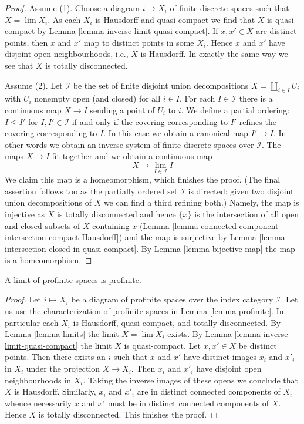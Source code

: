 \begin{proof}
Assume (1). Choose a diagram $i \mapsto X_i$ of finite discrete spaces
such that $X = \lim X_i$. As each $X_i$ is Hausdorff and quasi-compact we find
that $X$ is quasi-compact by Lemma \ref{lemma-inverse-limit-quasi-compact}.
If $x, x' \in X$ are distinct points, then $x$ and $x'$ map to
distinct points in some $X_i$. Hence $x$ and $x'$ have disjoint
open neighbourhoods, i.e., $X$ is Hausdorff. In exactly the same way
we see that $X$ is totally disconnected.

\medskip\noindent
Assume (2). Let $\mathcal{I}$ be the set of finite disjoint union
decompositions $X = \coprod_{i \in I} U_i$ with $U_i$ nonempty open
(and closed) for all $i \in I$.
For each $I \in \mathcal{I}$ there is a continuous map
$X \to I$ sending a point of $U_i$ to $i$. We define a partial
ordering: $I \leq I'$ for $I, I' \in \mathcal{I}$ if and only
if the covering corresponding to $I'$ refines the covering corresponding
to $I$. In this case we obtain a canonical map $I' \to I$. In other
words we obtain an inverse system of finite discrete spaces over $\mathcal{I}$.
The maps $X \to I$ fit together and we obtain a continuous map
$$
X \longrightarrow \lim_{I \in \mathcal{I}} I
$$
We claim this map is a homeomorphism, which finishes the proof.
(The final assertion follows too as the partially ordered set
$\mathcal{I}$ is directed: given two disjoint union decompositions
of $X$ we can find a third refining both.)
Namely, the map is injective as $X$ is totally disconnected
and hence $\{x\}$ is the intersection of all open and closed subsets
of $X$ containing $x$
(Lemma \ref{lemma-connected-component-intersection-compact-Hausdorff})
and  the map is surjective by
Lemma \ref{lemma-intersection-closed-in-quasi-compact}.
By Lemma \ref{lemma-bijective-map} the map is a homeomorphism.
\end{proof}

\begin{lemma}
\label{lemma-directed-inverse-limit-profinite}
A limit of profinite spaces is profinite.
\end{lemma}

\begin{proof}
Let $i \mapsto X_i$ be a diagram of profinite spaces
over the index category $\mathcal{I}$.
Let us use the characterization of profinite spaces in
Lemma \ref{lemma-profinite}. In particular each $X_i$ is
Hausdorff, quasi-compact, and totally disconnected.
By Lemma \ref{lemma-limits} the limit $X = \lim X_i$ exists.
By Lemma \ref{lemma-inverse-limit-quasi-compact}
the limit $X$ is quasi-compact. Let $x, x' \in X$ be distinct points.
Then there exists an $i$ such that $x$ and $x'$
have distinct images $x_i$ and $x'_i$ in $X_i$
under the projection $X \to X_i$. Then $x_i$ and $x'_i$
have disjoint open neighbourhoods in $X_i$. Taking the
inverse images of these opens we conclude that $X$ is Hausdorff.
Similarly, $x_i$ and $x'_i$ are in distinct connected components
of $X_i$ whence necessarily $x$ and $x'$ must be in distinct
connected components of $X$. Hence $X$ is totally disconnected.
This finishes the proof.
\end{proof}

